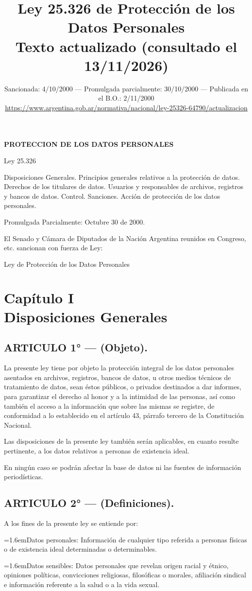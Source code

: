 \documentclass[10pt,a4paper]{article}
\title{\vspace{-1.5cm}\textbf{Ley 25.326 de Protección de los Datos Personales}\\[3pt]
  \large Texto actualizado (consultado el 13/11/2026)}
\author{\normalsize Sancionada: 4/10/2000 --- Promulgada parcialmente: 30/10/2000 --- Publicada en el B.O.: 2/11/2000\\[2pt]
  \small\url{https://www.argentina.gob.ar/normativa/nacional/ley-25326-64790/actualizacion}}
\date{}
\newcommand{\capitulo}[2]{\section[#1 --- #2]{#1\\[2pt]#2}}
\newcommand{\articulo}[1]{\subsection{#1}}
\newcommand{\inciso}[2]{\par{\hangindent=1.6em\hangafter=1\makebox[1.6em][l]{#1}#2\par}}
\begin{document}
\maketitle

{\small\indice}
\clearpage

\textbf{PROTECCION DE LOS DATOS PERSONALES}

Ley 25.326

Disposiciones Generales. Principios generales relativos a la protección de datos. Derechos de los titulares de datos. Usuarios y responsables de archivos, registros y bancos de datos. Control. Sanciones. Acción de protección de los datos personales.

Promulgada Parcialmente: Octubre 30 de 2000.

\begin{center}El Senado y Cámara de Diputados de la Nación Argentina reunidos en Congreso, etc. sancionan con fuerza de Ley:\end{center}
\begin{center}Ley de Protección de los Datos Personales\end{center}
\capitulo{Capítulo I}{Disposiciones Generales}
\articulo{ARTICULO 1° — (Objeto).}
La presente ley tiene por objeto la protección integral de los datos personales asentados en archivos, registros, bancos de datos, u otros medios técnicos de tratamiento de datos, sean éstos públicos, o privados destinados a dar informes, para garantizar el derecho al honor y a la intimidad de las personas, así como también el acceso a la información que sobre las mismas se registre, de conformidad a lo establecido en el artículo 43, párrafo tercero de la Constitución Nacional.

Las disposiciones de la presente ley también serán aplicables, en cuanto resulte pertinente, a los datos relativos a personas de existencia ideal.

En ningún caso se podrán afectar la base de datos ni las fuentes de información periodísticas.

\articulo{ARTICULO 2° — (Definiciones).}
A los fines de la presente ley se entiende por:

\inciso{—}{Datos personales: Información de cualquier tipo referida a personas físicas o de existencia ideal determinadas o determinables.}

\inciso{—}{Datos sensibles: Datos personales que revelan origen racial y étnico, opiniones políticas, convicciones religiosas, filosóficas o morales, afiliación sindical e información referente a la salud o a la vida sexual.}
\end{document}
